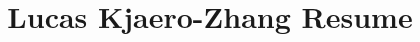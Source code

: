 \documentclass[margin]{res}
\title{Lucas Kjaero-Zhang Resume}
\begin{document}


\address{(619) 905-1772\\San Diego, CA}
\address{\href{mailto:lucas@lucaskjaerozhang.com}{Lucas@LucasKjaeroZhang.com}\\\href{https://www.lucaskjaerozhang.com}{www.LucasKjaeroZhang.com}}


\end{document}
